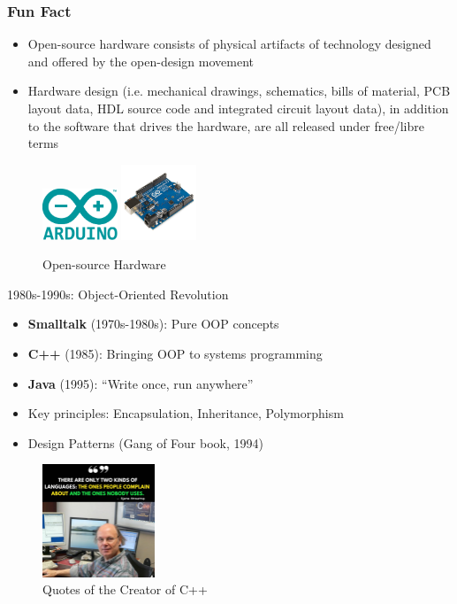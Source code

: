 \documentclass{beamer}
\begin{document}
\begin{frame}[t]
    \frametitle{Fun Fact}
    \begin{itemize}
        \scriptsize
        \item Open-source hardware consists of physical artifacts of technology designed and offered by the open-design movement
        \item Hardware design (i.e. mechanical drawings, schematics, bills of material, PCB layout data, HDL source code and integrated circuit layout data), in addition to the software that drives the hardware, are all released under free/libre terms
    \end{itemize}
    \begin{figure}
        \includegraphics[width=0.2\textwidth]{images/arduino.png}
        \includegraphics[width=0.2\textwidth]{images/Arduino_Uno.jpg}
    \caption{Open-source Hardware}
    \end{figure}
    
    
\end{frame}
\begin{frame}[t]{1980s-1990s: Object-Oriented Revolution}
\begin{itemize}
    \item \textbf{Smalltalk} (1970s-1980s): Pure OOP concepts
    \item \textbf{C++} (1985): Bringing OOP to systems programming
    \item \textbf{Java} (1995): ``Write once, run anywhere''
    \item Key principles: Encapsulation, Inheritance, Polymorphism
    \item Design Patterns (Gang of Four book, 1994)
\end{itemize}

\begin{figure}
    \includegraphics[width=0.3\textwidth]{images/cpp.jpeg}
    \caption{Quotes of the Creator of C++}
\end{figure}

\end{frame}
\end{document}
